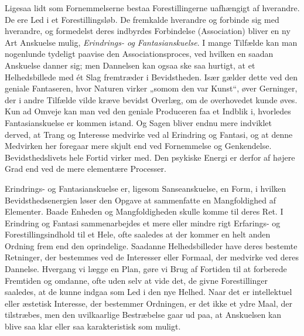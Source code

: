 \documentclass[12pt,a4paper]{book}
\newcommand{\opage}[1]{\marginnote{\footnotesize\textit{[#1]}}}
\begin{document}
Ligesaa lidt som Fornemmelserne bestaa Forestillingerne uafhængigt af
hverandre. De ere Led i et Forestillingsløb. De fremkalde hverandre og
forbinde sig med hverandre, og formedelst deres indbyrdes Forbindelse
(Association) bliver en ny Art Anskuelse mulig, \emph{Erindrings- og
Fantasianskuelse}. I mange Tilfælde kan man nogenlunde tydeligt paavise
den Associationsproces, ved hvilken en saadan Anskuelse danner sig; men
Dannelsen kan ogsaa ske saa hurtigt, at et Helhedsbillede med ét Slag
fremtræder i Bevidstheden. Især gælder dette ved den geniale
Fantaseren, hvor Naturen virker „somom den var Kunst“, øver Gerninger,
der i andre Tilfælde vilde kræve bevidst Overlæg, om de overhovedet
kunde øves. Kun ad Omveje kan man ved den geniale Produceren faa et
Indblik i, hvorledes Fantasianskuelse er kommen istand. Og Sagen bliver
endnu mere indviklet derved, at Trang og Interesse medvirke ved al
Erindring og Fantasi, og at denne Medvirken her foregaar mere skjult end
ved Fornemmelse og Genkendelse. Bevidsthedslivets hele Fortid virker
med. Den psykiske Energi er derfor af højere Grad end ved de mere
elementære Processer.

Erindrings- og Fantasianskuelse er, ligesom Sanseanskuelse, en Form, i
hvilken Bevidsthedsenergien løser den Opgave at sammenfatte en
Mangfoldighed af Elementer. Baade Enheden og Mangfoldigheden skulle komme
til deres Ret. \opage{53} I Erindring og Fantasi sammenarbejdes et mere eller
mindre rigt Erfarings- og Forestillingsindhold til et Hele, ofte
saaledes at der kommer en helt anden Ordning frem end den oprindelige.
Saadanne Helhedsbilleder have deres bestemte Retninger, der bestemmes
ved de Interesser eller Formaal, der medvirke ved deres Dannelse.
Hvergang vi lægge en Plan, gøre vi Brug af Fortiden til at forberede
Fremtiden og omdanne, ofte uden selv at vide det, de givne Forestillinger
saaledes, at de kunne indgaa som Led i den nye Helhed. Naar det er
intellektuel eller æstetisk Interesse, der bestemmer Ordningen, er det
ikke et ydre Maal, der tilstræbes, men den uvilkaarlige Bestræbelse gaar
ud paa, at Anskuelsen kan blive saa klar eller saa karakteristisk som
muligt.
\end{document}
